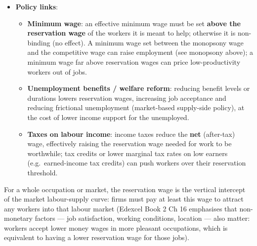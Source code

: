 \documentclass[a4paper,12pt]{article}
\begin{document}
\begin{itemize}
  \item \textbf{Policy links}:
  \begin{itemize}
    \item \textbf{Minimum wage}: an effective minimum wage must be set \textbf{above the reservation wage} of the workers it is meant to help; otherwise it is non-binding (no effect). A minimum wage set between the monopsony wage and the competitive wage can raise employment (see monopsony above); a minimum wage far above reservation wages can price low-productivity workers out of jobs.
    \item \textbf{Unemployment benefits / welfare reform}: reducing benefit levels or durations lowers reservation wages, increasing job acceptance and reducing frictional unemployment (market-based supply-side policy), at the cost of lower income support for the unemployed.
    \item \textbf{Taxes on labour income}: income taxes reduce the \textbf{net} (after-tax) wage, effectively raising the reservation wage needed for work to be worthwhile; tax credits or lower marginal tax rates on low earners (e.g.\ earned-income tax credits) can push workers over their reservation threshold.
  \end{itemize}
\end{itemize}
\begin{center}
\end{center}
For a whole occupation or market, the reservation wage is the vertical intercept of the market labour-supply curve: firms must pay at least this wage to attract any workers into that labour market (Edexcel Book 2 Ch 16 emphasises that non-monetary factors --- job satisfaction, working conditions, location --- also matter: workers accept lower money wages in more pleasant occupations, which is equivalent to having a lower reservation wage for those jobs).
\end{document}
